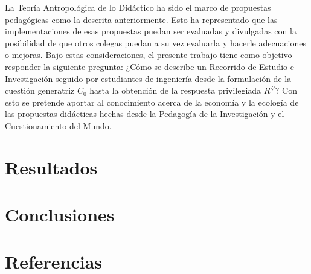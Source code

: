 \documentclass[spanish,]{book}
\begin{document}
La Teoría Antropológica de lo Didáctico ha sido el marco de propuestas pedagógicas como la descrita anteriormente. Esto ha representado que las implementaciones de esas propuestas puedan ser evaluadas y divulgadas con la posibilidad de que otros colegas puedan a su vez evaluarla y hacerle adecuaciones o mejoras. Bajo estas consideraciones, el presente trabajo tiene como objetivo responder la siguiente pregunta: ¿Cómo se describe un Recorrido de Estudio e Investigación seguido por estudiantes de ingeniería desde la formulación de la cuestión generatriz \(C_0\) hasta la obtención de la respuesta privilegiada \(R^\heartsuit\)? Con esto se pretende aportar al conocimiento acerca de la economía y la ecología de las propuestas didácticas hechas desde la Pedagogía de la Investigación y el Cuestionamiento del Mundo.

\hypertarget{resultados}{%
\chapter{Resultados}\label{resultados}}

\hypertarget{conclusiones}{%
\chapter{Conclusiones}\label{conclusiones}}

\hypertarget{referencias}{%
\chapter*{Referencias}\label{referencias}}

\begingroup
\setlength{\parindent}{-0.5in}
\setlength{\leftskip}{0.5in}

\hypertarget{refs}{}

\endgroup


\end{document}
